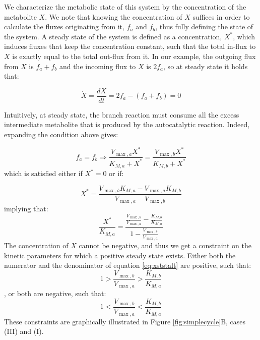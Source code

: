     We characterize the metabolic state of this system by the concentration of the metabolite $X$.
    We note that knowing the concentration of $X$ suffices in order to calculate the fluxes originating from it, $f_a$ and $f_b$, thus fully defining the state of the system.
    A steady state of the system is defined as a concentration, $X^*$, which induces fluxes that keep the concentration constant, such that the total in-flux to $X$ is exactly equal to the total out-flux from it.
    In our example, the outgoing flux from $X$ is $f_a+f_b$ and the incoming flux to $X$ is $2f_a$, so at steady state it holds that:

    \begin{equation}
      \label{eq:xdyna}
      \dot X = \frac{dX}{dt} = 2f_a - (f_a + f_b) = 0
    \end{equation}

    Intuitively, at steady state, the branch reaction must consume all the excess intermediate metabolite that is produced by the autocatalytic reaction.
    Indeed, expanding the condition above gives:

    \begin{equation*}
      f_a = f_b \Rightarrow \frac{V_{\max,a}X^*}{K_{M,a}+X^*}=\frac{V_{\max,b}X^*}{K_{M,b}+X^*}
    \end{equation*}
    which is satisfied either if $X^*=0$ or if:

    \begin{equation}
      \label{eq:xstst}
      X^*=\frac{V_{\max,b}K_{M,a}-V_{\max,a}K_{M,b}}{V_{\max,a}-V_{\max,b}}
    \end{equation}
    implying that:
    \begin{equation}
      \label{eq:xststalt}
      \frac{X^*}{K_{M,a}}=\frac{\frac{V_{\max,b}}{V_{\max,a}}-\frac{K_{M,b}}{K_{M,a}}}{1-\frac{V_{\max,b}}{V_{\max,a}}}
    \end{equation}
    The concentration of $X$ cannot be negative, and thus we get a constraint on the kinetic parameters for which a positive steady state exists.
    Either both the numerator and the denominator of equation \ref{eq:xststalt} are positive, such that:
    \begin{equation*}
    1>\frac{V_{\max,b}}{V_{\max,a}}>\frac{K_{M,b}}{K_{M,a}}
    \end{equation*}
    , or both are negative, such that:
    \begin{equation*}
    1<\frac{V_{\max,b}}{V_{\max,a}}<\frac{K_{M,b}}{K_{M,a}}
    \end{equation*}
    These constraints are graphically illustrated in Figure \ref{fig:simplecycle}B, cases (III) and (I).

